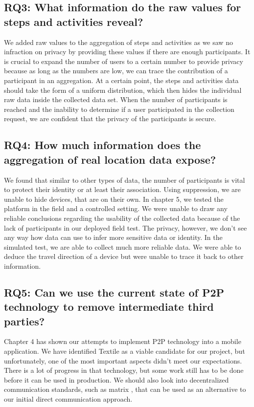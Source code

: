 \subsection*{RQ3: What information do the raw values for steps and activities reveal?}
We added raw values to the aggregation of steps and activities as we saw no infraction on privacy by providing these values if there are enough participants. It is crucial to expand the number of users to a certain number to provide privacy because as long as the numbers are low, we can trace the contribution of a participant in an aggregation. At a certain point, the steps and activities data should take the form of a uniform distribution, which then hides the individual raw data inside the collected data set. When the number of participants is reached and the inability to determine if a user participated in the collection request, we are confident that the privacy of the participants is secure. 

\subsection*{RQ4: How much information does the aggregation of real location data expose?}
We found that similar to other types of data, the number of participants is vital to protect their identity or at least their association. Using suppression, we are unable to hide devices, that are on their own. In chapter 5, we tested the platform in the field and a controlled setting. We were unable to draw any reliable conclusions regarding the usability of the collected data because of the lack of participants in our deployed field test. The privacy, however, we don't see any way how data can use to infer more sensitive data or identity. In the simulated test, we are able to collect much more reliable data. We were able to deduce the travel direction of a device but were unable to trace it back to other information.

\subsection*{RQ5: Can we use the current state of P2P technology to remove intermediate third parties?}
Chapter 4 has shown our attempts to implement P2P technology into a mobile application. We have identified Textile as a viable candidate for our project, but unfortunately, one of the most important aspects didn't meet our expectations. There is a lot of progress in that technology, but some work still has to be done before it can be used in production. We should also look into decentralized communication standards, such as matrix
, that can be used as an alternative to our initial direct communication approach.

